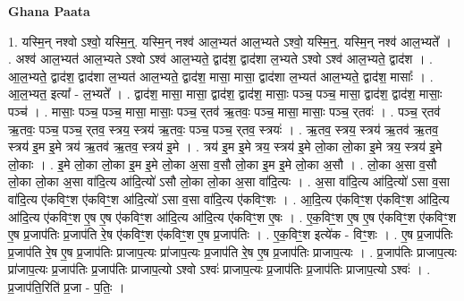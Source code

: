 \documentclass[17pt]{extarticle}
\begin{document}
\textbf{Ghana Paata } \newline

1. यस्मि॒न् नश्वो ऽश्वो॒ यस्मि॒न्॒. यस्मि॒न् नश्व॑ आल॒भ्यत॑ आल॒भ्यते ऽश्वो॒ यस्मि॒न्॒. यस्मि॒न् नश्व॑ आल॒भ्यते᳚ । . अश्व॑ आल॒भ्यत॑ आल॒भ्यते ऽश्वो ऽश्व॑ आल॒भ्यते॒ द्वाद॑श॒ द्वाद॑शा ल॒भ्यते ऽश्वो ऽश्व॑ आल॒भ्यते॒ द्वाद॑श । . आ॒ल॒भ्यते॒ द्वाद॑श॒ द्वाद॑शा ल॒भ्यत॑ आल॒भ्यते॒ द्वाद॑श॒ मासा॒ मासा॒ द्वाद॑शा ल॒भ्यत॑ आल॒भ्यते॒ द्वाद॑श॒ मासाः᳚ । . आ॒ल॒भ्यत॒ इत्या᳚ - ल॒भ्यते᳚ । . द्वाद॑श॒ मासा॒ मासा॒ द्वाद॑श॒ द्वाद॑श॒ मासाः॒ पञ्च॒ पञ्च॒ मासा॒ द्वाद॑श॒ द्वाद॑श॒ मासाः॒ पञ्च॑ । . मासाः॒ पञ्च॒ पञ्च॒ मासा॒ मासाः॒ पञ्च॒ र्‌तव॑ ऋ॒तवः॒ पञ्च॒ मासा॒ मासाः॒ पञ्च॒ र्‌तवः॑ । . पञ्च॒ र्‌तव॑ ऋ॒तवः॒ पञ्च॒ पञ्च॒ र्‌तव॒ स्त्रय॒ स्त्रय॑ ऋ॒तवः॒ पञ्च॒ पञ्च॒ र्‌तव॒ स्त्रयः॑ । . ऋ॒तव॒ स्त्रय॒ स्त्रय॑ ऋ॒तव॑ ऋ॒तव॒ स्त्रय॑ इ॒म इ॒मे त्रय॑ ऋ॒तव॑ ऋ॒तव॒ स्त्रय॑ इ॒मे । . त्रय॑ इ॒म इ॒मे त्रय॒ स्त्रय॑ इ॒मे लो॒का लो॒का इ॒मे त्रय॒ स्त्रय॑ इ॒मे लो॒काः । . इ॒मे लो॒का लो॒का इ॒म इ॒मे लो॒का अ॒सा व॒सौ लो॒का इ॒म इ॒मे लो॒का अ॒सौ । . लो॒का अ॒सा व॒सौ लो॒का लो॒का अ॒सा वा॑दि॒त्य आ॑दि॒त्यो॑ ऽसौ लो॒का लो॒का अ॒सा वा॑दि॒त्यः । . अ॒सा वा॑दि॒त्य आ॑दि॒त्यो॑ ऽसा व॒सा वा॑दि॒त्य ए॑कविꣳ॒॒श ए॑कविꣳ॒॒श आ॑दि॒त्यो॑ ऽसा व॒सा वा॑दि॒त्य ए॑कविꣳ॒॒शः । . आ॒दि॒त्य ए॑कविꣳ॒॒श ए॑कविꣳ॒॒श आ॑दि॒त्य आ॑दि॒त्य ए॑कविꣳ॒॒श ए॒ष ए॒ष ए॑कविꣳ॒॒श आ॑दि॒त्य आ॑दि॒त्य ए॑कविꣳ॒॒श ए॒षः । . ए॒क॒विꣳ॒॒श ए॒ष ए॒ष ए॑कविꣳ॒॒श ए॑कविꣳ॒॒श ए॒ष प्र॒जाप॑तिः प्र॒जाप॑ति रे॒ष ए॑कविꣳ॒॒श ए॑कविꣳ॒॒श ए॒ष प्र॒जाप॑तिः । . ए॒क॒विꣳ॒॒श इत्ये॑क - विꣳ॒॒शः । . ए॒ष प्र॒जाप॑तिः प्र॒जाप॑ति रे॒ष ए॒ष प्र॒जाप॑तिः प्राजाप॒त्यः प्रा॑जाप॒त्यः प्र॒जाप॑ति रे॒ष ए॒ष प्र॒जाप॑तिः प्राजाप॒त्यः । . प्र॒जाप॑तिः प्राजाप॒त्यः प्रा॑जाप॒त्यः प्र॒जाप॑तिः प्र॒जाप॑तिः प्राजाप॒त्यो ऽश्वो ऽश्वः॑ प्राजाप॒त्यः प्र॒जाप॑तिः प्र॒जाप॑तिः प्राजाप॒त्यो ऽश्वः॑ । . प्र॒जाप॑ति॒रिति॑ प्र॒जा - प॒तिः॒ । \newline
\end{document}
